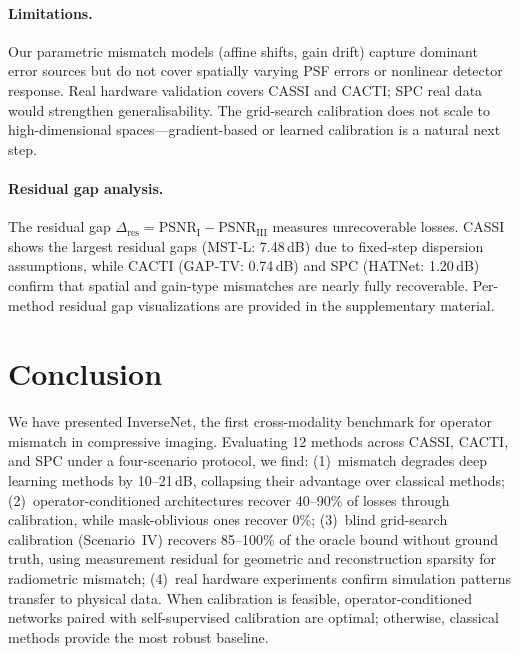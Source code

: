 \documentclass[runningheads]{llncs}
\begin{document}
\paragraph{Limitations.}
Our parametric mismatch models (affine shifts, gain drift) capture dominant error sources but do not cover spatially varying PSF errors or nonlinear detector response.
Real hardware validation covers CASSI and CACTI; SPC real data would strengthen generalisability.
The grid-search calibration does not scale to high-dimensional spaces---gradient-based or learned calibration is a natural next step.

\paragraph{Residual gap analysis.}
The residual gap $\Delta_{\text{res}} = \text{PSNR}_{\text{I}} - \text{PSNR}_{\text{III}}$ measures unrecoverable losses.
CASSI shows the largest residual gaps (MST-L: 7.48\,dB) due to fixed-step dispersion assumptions, while CACTI (GAP-TV: 0.74\,dB) and SPC (HATNet: 1.20\,dB) confirm that spatial and gain-type mismatches are nearly fully recoverable.
Per-method residual gap visualizations are provided in the supplementary material.

\section{Conclusion}
\label{sec:conclusion}

We have presented InverseNet, the first cross-modality benchmark for operator mismatch in compressive imaging.
Evaluating 12 methods across CASSI, CACTI, and SPC under a four-scenario protocol, we find:
(1)~mismatch degrades deep learning methods by 10--21\,dB, collapsing their advantage over classical methods;
(2)~operator-conditioned architectures recover 40--90\% of losses through calibration, while mask-oblivious ones recover 0\%;
(3)~blind grid-search calibration (Scenario~IV) recovers 85--100\% of the oracle bound without ground truth, using measurement residual for geometric and reconstruction sparsity for radiometric mismatch;
(4)~real hardware experiments confirm simulation patterns transfer to physical data.
When calibration is feasible, operator-conditioned networks paired with self-supervised calibration are optimal; otherwise, classical methods provide the most robust baseline.
\end{document}
